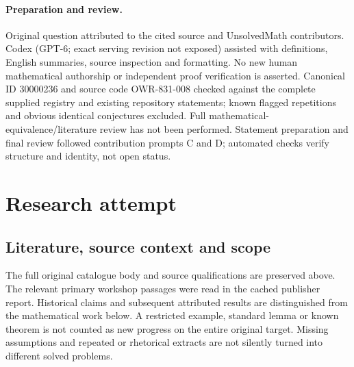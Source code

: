 \documentclass[11pt]{article}
\begin{document}
\paragraph{Preparation and review.}
Original question attributed to the cited source and UnsolvedMath contributors. Codex (GPT-6; exact serving revision not exposed) assisted with definitions, English summaries, source inspection and formatting. No new human mathematical authorship or independent proof verification is asserted. Canonical ID 30000236 and source code OWR-831-008 checked against the complete supplied registry and existing repository statements; known flagged repetitions and obvious identical conjectures excluded. Full mathematical-equivalence/literature review has not been performed. Statement preparation and final review followed contribution prompts C and D; automated checks verify structure and identity, not open status.
\label{end:30000236}

\section{Research attempt}
\subsection{Literature, source context and scope}
The full original catalogue body and source qualifications are preserved above. The relevant primary workshop passages were read in the cached publisher report. Historical claims and subsequent attributed results are distinguished from the mathematical work below. A restricted example, standard lemma or known theorem is not counted as new progress on the entire original target. Missing assumptions and repeated or rhetorical extracts are not silently turned into different solved problems.
\end{document}
